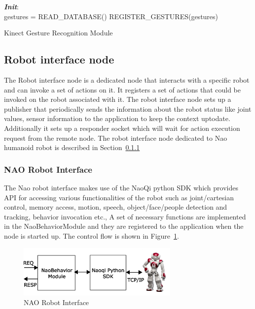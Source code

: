 \begin{algorithm}[H]
 \textbf{\emph{Init}}:\\
 \quad gestures = READ\_DATABASE()\;
 \quad REGISTER\_GESTURES(gestures)\;
 \caption{Kinect Gesture Recognition Module}
 \label{alg:gesture_recognize}
\end{algorithm}
\subsection{Robot interface node} 
The Robot interface node is a dedicated node that interacts with a specific robot and can invoke a set of actions on it.  It registers a set of actions that could be invoked on the robot associated with it. The robot interface node sets up a publisher that periodically sends the information about the robot status like joint values, sensor information to the application to keep the context uptodate. Additionally it sets up a responder socket which will wait for action execution request from the remote node. The robot interface node dedicated to Nao humanoid robot is described in Section~\ref{sssec:nao_interface}
\subsubsection{NAO Robot Interface}
\label{sssec:nao_interface}
The Nao robot interface makes use of the NaoQi python SDK which provides API for accessing various functionalities of the robot such as joint/cartesian control, memory access, motion, speech, object/face/people detection and tracking, behavior invocation etc., A set of necessary functions are implemented in the NaoBehaviorModule and they are registered to the application when the node is started up. The control flow is shown in Figure~\ref{fig:nao_interface}.

\begin{figure}[H]
\centering
\includegraphics[width=0.7\textwidth]{assets/NaoBehaviorModule.eps}
\caption[NAO Robot Interface]{NAO Robot Interface}
\label{fig:nao_interface}
\end{figure}

